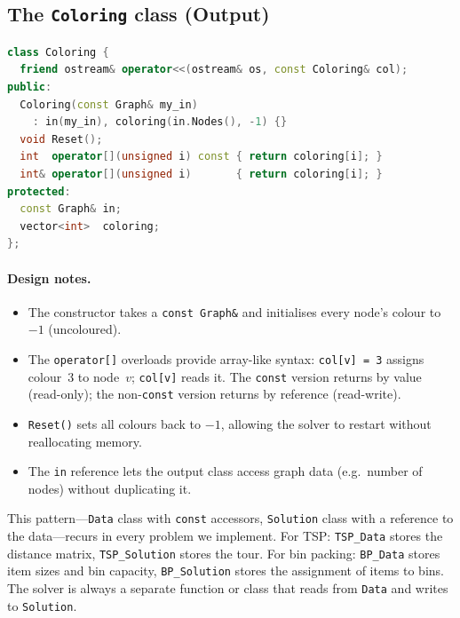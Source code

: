 \subsection{The \texttt{Coloring} class (Output)}
\label{ssec:coloring-class}

\begin{lstlisting}[language=C++,
  caption={\texttt{GC\_Data.hh} --- the \texttt{Coloring} class
           (solution).},
  label={lst:gc-data-hh-coloring}]
class Coloring {
  friend ostream& operator<<(ostream& os, const Coloring& col);
public:
  Coloring(const Graph& my_in)
    : in(my_in), coloring(in.Nodes(), -1) {}
  void Reset();
  int  operator[](unsigned i) const { return coloring[i]; }
  int& operator[](unsigned i)       { return coloring[i]; }
protected:
  const Graph& in;
  vector<int>  coloring;
};
\end{lstlisting}

\paragraph{Design notes.}
\begin{itemize}[nosep]
  \item The constructor takes a \texttt{const Graph\&} and
    initialises every node's colour to $-1$ (uncoloured).
  \item The \texttt{operator[]} overloads provide array-like
    syntax: \texttt{col[v] = 3} assigns colour~3 to node~$v$;
    \texttt{col[v]} reads it.
    The \texttt{const} version returns by value (read-only);
    the non-\texttt{const} version returns by reference
    (read-write).
  \item \texttt{Reset()} sets all colours back to $-1$, allowing
    the solver to restart without reallocating memory.
  \item The \texttt{in} reference lets the output class access
    graph data (e.g.\ number of nodes) without duplicating it.
\end{itemize}

\begin{observation}
This pattern---\texttt{Data} class with \texttt{const} accessors,
\texttt{Solution} class with a reference to the data---recurs in
every problem we implement.  For TSP: \texttt{TSP\_Data} stores
the distance matrix, \texttt{TSP\_Solution} stores the tour.
For bin packing: \texttt{BP\_Data} stores item sizes and bin
capacity, \texttt{BP\_Solution} stores the assignment of items to
bins.  The solver is always a separate function or class that
reads from \texttt{Data} and writes to \texttt{Solution}.
\end{observation}


